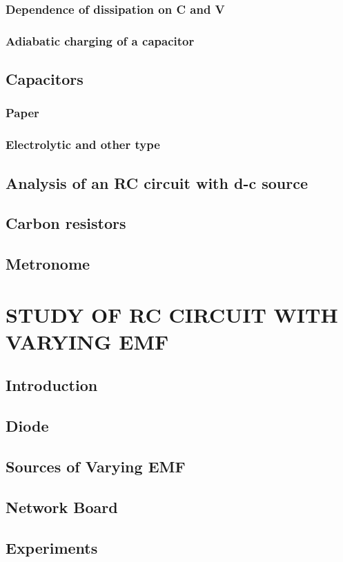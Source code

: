 \documentclass[12pt]{book}
\begin{document}
\subsection{Dependence of dissipation on C and V}
\subsection{Adiabatic charging of a capacitor}
\section{Capacitors}
\subsection{Paper}
\subsection{Electrolytic and other type}
\section{Analysis of an RC circuit with d-c source}
\section{Carbon resistors}
\section{Metronome}

\chapter{STUDY OF RC CIRCUIT WITH VARYING EMF}
\section{Introduction}
\section{Diode}
\section{Sources of Varying EMF}
\section{Network Board}
\section{Experiments}
\end{document}
